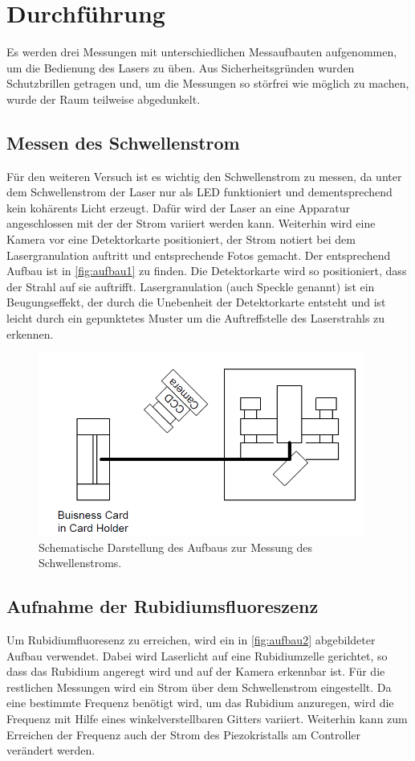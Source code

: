 \section{Durchführung}
\label{sec:Durchführung}
Es werden drei Messungen mit unterschiedlichen Messaufbauten aufgenommen, um die Bedienung des Lasers zu üben.
Aus Sicherheitsgründen wurden Schutzbrillen getragen und, um die Messungen so störfrei wie möglich zu machen,
wurde der Raum teilweise abgedunkelt.

\subsection{Messen des Schwellenstrom}
\label{sec:Schwellenstrom}
Für den weiteren Versuch ist es wichtig den Schwellenstrom zu messen, da unter dem Schwellenstrom der Laser nur
als LED funktioniert und dementsprechend kein kohärents Licht erzeugt. Dafür wird der Laser an eine Apparatur
angeschlossen mit der der Strom variiert werden kann. Weiterhin wird eine Kamera vor eine Detektorkarte
positioniert, der Strom notiert bei dem Lasergranulation auftritt und entsprechende Fotos gemacht. Der
entsprechend Aufbau ist in \autoref{fig:aufbau1} zu finden.
Die Detektorkarte wird so positioniert, dass der Strahl auf sie auftrifft. Lasergranulation (auch Speckle genannt)
ist ein Beugungseffekt, der durch die Unebenheit der Detektorkarte entsteht und ist leicht durch ein gepunktetes
Muster um die Auftreffstelle des Laserstrahls zu erkennen.

\begin{figure}
    \centering
    \includegraphics[height=6cm]{content/pics/aufbau1.png}
    \caption{Schematische Darstellung des Aufbaus zur Messung des Schwellenstroms. \cite{V60}}
    \label{fig:aufbau1}
\end{figure}

\subsection{Aufnahme der Rubidiumsfluoreszenz}
\label{sec:Rubidium}
Um Rubidiumfluoresenz zu erreichen, wird ein in \autoref{fig:aufbau2} abgebildeter Aufbau verwendet. Dabei wird
Laserlicht auf eine Rubidiumzelle gerichtet, so dass das Rubidium angeregt wird und auf der Kamera erkennbar ist.
Für die restlichen Messungen wird ein Strom über dem Schwellenstrom eingestellt.
Da eine bestimmte Frequenz benötigt wird, um das Rubidium anzuregen, wird die Frequenz mit Hilfe eines
winkelverstellbaren Gitters variiert. Weiterhin kann zum Erreichen der Frequenz auch der Strom des Piezokristalls
am Controller verändert werden.

